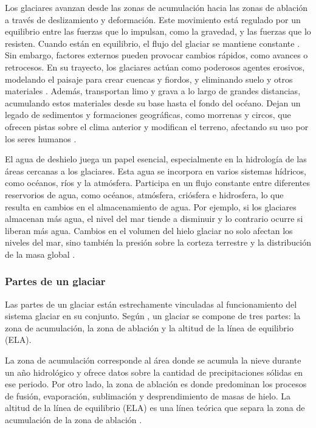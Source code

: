 Los glaciares avanzan desde las zonas de acumulación hacia las zonas de ablación a través de deslizamiento y deformación. Este movimiento está regulado por un equilibrio entre las fuerzas que lo impulsan, como la gravedad, y las fuerzas que lo resisten. Cuando están en equilibrio, el flujo del glaciar se mantiene constante \cite{benn2010glaciers, cuffey2010physics}. Sin embargo, factores externos pueden provocar cambios rápidos, como avances o retrocesos. En su trayecto, los glaciares actúan como poderosos agentes erosivos, modelando el paisaje para crear cuencas y fiordos, y eliminando suelo y otros materiales \cite{ermolin2015ambientes}. Además, transportan limo y grava a lo largo de grandes distancias, acumulando estos materiales desde su base hasta el fondo del océano. Dejan un legado de sedimentos y formaciones geográficas, como morrenas y circos, que ofrecen pistas sobre el clima anterior y modifican el terreno, afectando su uso por los seres humanos \cite{benn2010glaciers}.

El agua de deshielo juega un papel esencial, especialmente en la hidrología de las áreas cercanas a los glaciares. Esta agua se incorpora en varios sistemas hídricos, como océanos, ríos y la atmósfera. Participa en un flujo constante entre diferentes reservorios de agua, como océanos, atmósfera, criósfera e hidrosfera, lo que resulta en cambios en el almacenamiento de agua. Por ejemplo, si los glaciares almacenan más agua, el nivel del mar tiende a disminuir y lo contrario ocurre si liberan más agua. Cambios en el volumen del hielo glaciar no solo afectan los niveles del mar, sino también la presión sobre la corteza terrestre y la distribución de la masa global \cite{benn2010glaciers}.

\subsubsection{Partes de un glaciar}

Las partes de un glaciar están estrechamente vinculadas al funcionamiento del sistema glaciar en su conjunto. Según , un glaciar se compone de tres partes: la zona de acumulación, la zona de ablación y la altitud de la línea de equilibrio (ELA).

La zona de acumulación corresponde al área donde se acumula la nieve durante un año hidrológico y ofrece datos sobre la cantidad de precipitaciones sólidas en ese periodo. Por otro lado, la zona de ablación es donde predominan los procesos de fusión, evaporación, sublimación y desprendimiento de masas de hielo. La altitud de la línea de equilibrio (ELA) es una línea teórica que separa la zona de acumulación de la zona de ablación \cite{francou2004tropical, benn2010glaciers}.

